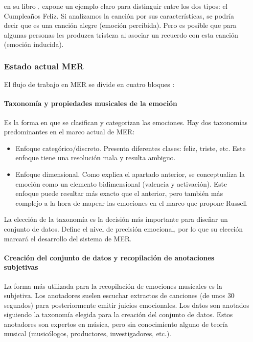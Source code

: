 \documentclass[12pt,a4paper,Spanish]{article}
\begin{document}
\citeauthor{yang2011music} en su libro , expone un ejemplo claro para distinguir entre los dos tipos: el Cumpleaños Feliz. Si analizamos la canción por sus características, se podría decir que es una canción alegre (emoción percibida). Pero es posible que para algunas personas les produzca tristeza al asociar un recuerdo con esta canción (emoción inducida).

\subsubsection{Estado actual MER}
El flujo de trabajo en MER se divide en cuatro bloques \cite{GomezCanon2021SPM}:


\paragraph{Taxonomía y propiedades musicales de la emoción}\label{tax_emo}
Es la forma en que se clasifican y categorizan las emociones. Hay dos taxonomías predominantes en el marco actual de MER:
\begin{itemize}
	\item Enfoque categórico/discreto. Presenta diferentes clases: feliz, triste, etc. Este enfoque tiene una resolución mala y resulta ambiguo.
	\item Enfoque dimensional. Como explica el apartado anterior, se conceptualiza la emoción como un elemento bidimensional (valencia y activación). Este enfoque puede resultar más exacto que el anterior, pero también más complejo a la hora de mapear las emociones en el marco que propone Russell \cite{posner2005circumplex}
\end{itemize}

La elección de la taxonomía es la decisión más importante para diseñar un conjunto de datos. Define el nivel de precisión emocional, por lo que su elección marcará el desarrollo del sistema de MER.

\paragraph{Creación del conjunto de datos y recopilación de anotaciones subjetivas}
La forma más utilizada para la recopilación de emociones musicales es la subjetiva. Los anotadores suelen escuchar extractos de canciones (de unos 30 segundos) para posteriormente emitir juicios emocionales. Los datos son anotados siguiendo la taxonomía elegida para la creación del conjunto de datos. Estos anotadores son expertos en música, pero sin conocimiento alguno de teoría musical (musicólogos, productores, investigadores, etc.).
\newline
\end{document}

